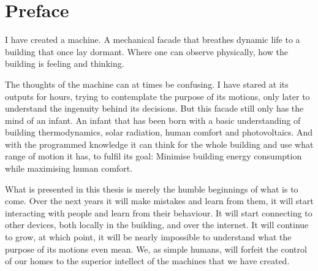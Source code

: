 \begingroup
\let\clearpage\relax
\let\cleardoublepage\relax
\let\cleardoublepage\relax

\chapter*{Preface}

I have created a machine. A mechanical facade that breathes dynamic life to a building that once lay dormant. Where one can observe physically, how the building is feeling and thinking. 

The thoughts of the machine can at times be confusing. I have stared at its outputs for hours, trying to contemplate the purpose of its motions, only later to understand the ingenuity behind its decisions. But this facade still only has the mind of an infant. An infant that has been born with a basic understanding of building thermodynamics, solar radiation, human comfort and photovoltaics. And with the programmed knowledge it can think for the whole building and use what range of motion it has, to fulfil its goal: Minimise building energy consumption while maximising human comfort.

What is presented in this thesis is merely the humble beginnings of what is to come. Over the next years it will make mistakes and learn from them, it will start interacting with people and learn from their behaviour. It will start connecting to other devices, both locally in the building, and over the internet. It will continue to grow, at which point, it will be nearly impossible to understand what the purpose of its motions even mean. We, as simple humans, will forfeit the control of our homes to the superior intellect of the machines that we have created.

\endgroup

\cleardoublepage%

